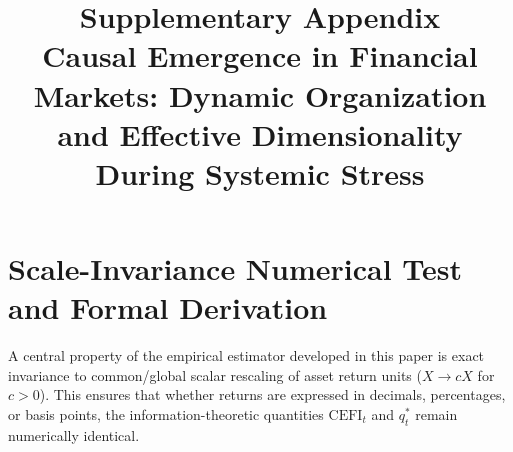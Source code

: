 \documentclass[12pt]{article}
\title{\textbf{Supplementary Appendix} \\ \Large Causal Emergence in Financial Markets: Dynamic Organization and Effective Dimensionality During Systemic Stress}
\author{}
\date{}
\begin{document}
\maketitle

\tableofcontents
\newpage

\section{Scale-Invariance Numerical Test and Formal Derivation}
\label{app:scale_invariance}

A central property of the empirical estimator developed in this paper is exact invariance to common/global scalar rescaling of asset return units ($X \to c X$ for $c > 0$). This ensures that whether returns are expressed in decimals, percentages, or basis points, the information-theoretic quantities $\mathrm{CEFI}_t$ and $q_t^*$ remain numerically identical.
\end{document}
